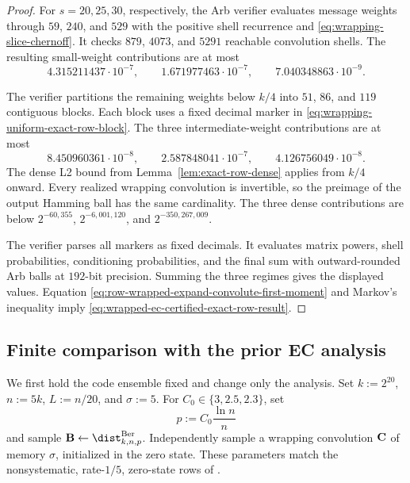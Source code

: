 \begin{proof}
For $s=20,25,30$, respectively, the Arb verifier evaluates message weights
through $59$, $240$, and $529$ with the positive shell recurrence and
\eqref{eq:wrapping-slice-chernoff}.  It checks $879$, $4073$, and $5291$
reachable convolution shells.  The resulting small-weight contributions are
at most
\[
 4.315211437\mathbin{\cdot}10^{-7},\qquad
 1.671977463\mathbin{\cdot}10^{-7},\qquad
 7.040348863\mathbin{\cdot}10^{-9}.
\]

The verifier partitions the remaining weights below $k/4$ into $51$, $86$,
and $119$ contiguous blocks.  Each block uses a fixed decimal marker in
\eqref{eq:wrapping-uniform-exact-row-block}.  The three intermediate-weight
contributions are at most
\[
 8.450960361\mathbin{\cdot}10^{-8},\qquad
 2.587848041\mathbin{\cdot}10^{-7},\qquad
 4.126756049\mathbin{\cdot}10^{-8}.
\]
The dense L2 bound from Lemma~\ref{lem:exact-row-dense} applies from $k/4$
onward.  Every realized wrapping convolution is invertible, so the preimage of
the output Hamming ball has the same cardinality.  The three dense
contributions are below $2^{-60{,}355}$, $2^{-6{,}001{,}120}$, and
$2^{-350{,}267{,}009}$.

The verifier parses all markers as fixed decimals.  It evaluates matrix
powers, shell probabilities, conditioning probabilities, and the final sum
with outward-rounded Arb balls at $192$-bit precision.  Summing the three
regimes gives the displayed values.  Equation
\eqref{eq:row-wrapped-expand-convolute-first-moment} and Markov's inequality
imply \eqref{eq:wrapped-ec-certified-exact-row-result}.
\end{proof}

\subsection{Finite comparison with the prior EC analysis}
\label{sec:wrapped-ec-finite-comparison}

We first hold the code ensemble fixed and change only the analysis.  Set
$k:=2^{20}$, $n:=5k$, $L:=n/20$, and $\sigma:=5$.  For
$C_0\in\{3,2.5,2.3\}$, set
\begin{equation}
 p:=C_0\frac{\ln n}{n}
 \label{eq:wrapped-ec-comparison-density}
\end{equation}
and sample $\B\gets\dist^{\mathrm{Ber}}_{k,n,p}$.  Independently sample a
wrapping convolution $\mathbf C$ of memory $\sigma$, initialized in the zero state.
These parameters match the nonsystematic, rate-$1/5$, zero-state rows of
\cite[Table~4]{EC}.

